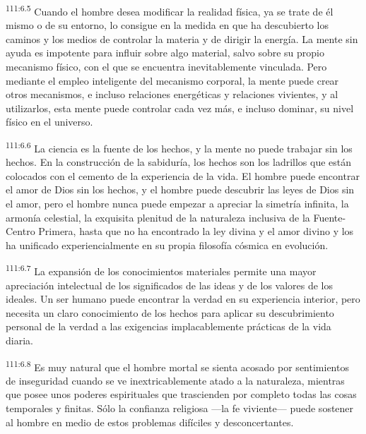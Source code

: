 \documentclass[twoside, 11pt]{book}
\begin{document}
\par
\textsuperscript{111:6.5} Cuando el hombre desea modificar la realidad física, ya se trate de él mismo o de su entorno, lo consigue en la medida en que ha descubierto los caminos y los medios de controlar la materia y de dirigir la energía. La mente sin ayuda es impotente para influir sobre algo material, salvo sobre su propio mecanismo físico, con el que se encuentra inevitablemente vinculada. Pero mediante el empleo inteligente del mecanismo corporal, la mente puede crear otros mecanismos, e incluso relaciones energéticas y relaciones vivientes, y al utilizarlos, esta mente puede controlar cada vez más, e incluso dominar, su nivel físico en el universo.

\par
\textsuperscript{111:6.6} La ciencia es la fuente de los hechos, y la mente no puede trabajar sin los hechos. En la construcción de la sabiduría, los hechos son los ladrillos que están colocados con el cemento de la experiencia de la vida. El hombre puede encontrar el amor de Dios sin los hechos, y el hombre puede descubrir las leyes de Dios sin el amor, pero el hombre nunca puede empezar a apreciar la simetría infinita, la armonía celestial, la exquisita plenitud de la naturaleza inclusiva de la Fuente-Centro Primera, hasta que no ha encontrado la ley divina y el amor divino y los ha unificado experiencialmente en su propia filosofía cósmica en evolución.

\par
\textsuperscript{111:6.7} La expansión de los conocimientos materiales permite una mayor apreciación intelectual de los significados de las ideas y de los valores de los ideales. Un ser humano puede encontrar la verdad en su experiencia interior, pero necesita un claro conocimiento de los hechos para aplicar su descubrimiento personal de la verdad a las exigencias implacablemente prácticas de la vida diaria.

\par
\textsuperscript{111:6.8} Es muy natural que el hombre mortal se sienta acosado por sentimientos de inseguridad cuando se ve inextricablemente atado a la naturaleza, mientras que posee unos poderes espirituales que trascienden por completo todas las cosas temporales y finitas. Sólo la confianza religiosa ---la fe viviente--- puede sostener al hombre en medio de estos problemas difíciles y desconcertantes.
\end{document}
